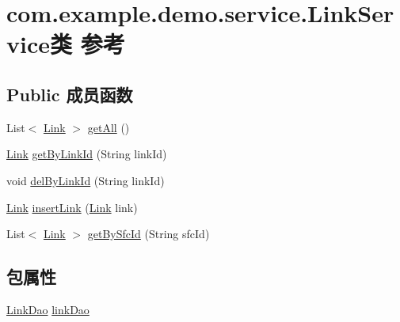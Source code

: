 \hypertarget{classcom_1_1example_1_1demo_1_1service_1_1_link_service}{}\section{com.\+example.\+demo.\+service.\+Link\+Service类 参考}
\label{classcom_1_1example_1_1demo_1_1service_1_1_link_service}
\subsection*{Public 成员函数}
\begin{DoxyCompactItemize}
\item 
List$<$ \mbox{\hyperlink{classcom_1_1example_1_1demo_1_1modular_1_1_link}{Link}} $>$ \mbox{\hyperlink{classcom_1_1example_1_1demo_1_1service_1_1_link_service_a3d1d5dfde2dd874b4a80c0ad03b0b1c8}{get\+All}} ()
\item 
\mbox{\hyperlink{classcom_1_1example_1_1demo_1_1modular_1_1_link}{Link}} \mbox{\hyperlink{classcom_1_1example_1_1demo_1_1service_1_1_link_service_aa544a284282931925d21628010e9f6f9}{get\+By\+Link\+Id}} (String link\+Id)
\item 
void \mbox{\hyperlink{classcom_1_1example_1_1demo_1_1service_1_1_link_service_a8a2fc496f233fbf2ff7c0107c2c368c7}{del\+By\+Link\+Id}} (String link\+Id)
\item 
\mbox{\hyperlink{classcom_1_1example_1_1demo_1_1modular_1_1_link}{Link}} \mbox{\hyperlink{classcom_1_1example_1_1demo_1_1service_1_1_link_service_afac835ac1e256e3f541d5a38400a7047}{insert\+Link}} (\mbox{\hyperlink{classcom_1_1example_1_1demo_1_1modular_1_1_link}{Link}} link)
\item 
List$<$ \mbox{\hyperlink{classcom_1_1example_1_1demo_1_1modular_1_1_link}{Link}} $>$ \mbox{\hyperlink{classcom_1_1example_1_1demo_1_1service_1_1_link_service_a5b02639405e897a0f429ad1cc0e54990}{get\+By\+Sfc\+Id}} (String sfc\+Id)
\end{DoxyCompactItemize}
\subsection*{包属性}
\begin{DoxyCompactItemize}
\item 
\mbox{\hyperlink{interfacecom_1_1example_1_1demo_1_1dao_1_1_link_dao}{Link\+Dao}} \mbox{\hyperlink{classcom_1_1example_1_1demo_1_1service_1_1_link_service_a3b92ee611c7d2b22f94b7f1b2b2bcf47}{link\+Dao}}
\end{DoxyCompactItemize}


